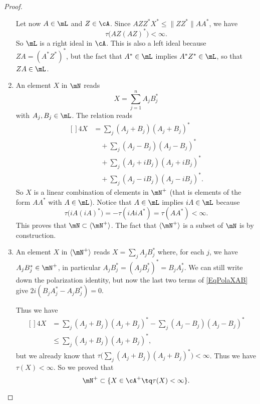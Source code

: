 \begin{proof}
\begin{enumerate}
            Let now $A\in\mL$ and $Z\in\cA$. Since $AZZ^*X^*\leq\| ZZ^* \|AA^*$, we have 
            \begin{equation}
                \tau\big( AZ(AZ)^* \big)<\infty.
            \end{equation}
            So $\mL$ is a right ideal in $\cA$. This is also a left ideal because $ZA=(A^*Z^*)^*$, but the fact that $A^*\in\mL$ implies $A^*Z^*\in\mL$, so that $ZA\in\mL$.
        \item
            An element $X$ in $\mN$ reads
            \begin{equation}
                X=\sum_{j=1}^{n}A_jB_j^*
            \end{equation}
            with $A_j,B_j\in\mL$. The  relation reads
            \begin{equation}        \label{EqPolaXAB}
                \begin{aligned}[]
                    4X&=\sum_j(A_j+B_j)(A_j+B_j)^*\\
                    &\quad+\sum_j(A_j-B_j)(A_j-B_j)^*\\
                    &\quad+\sum_j(A_j+iB_j)(A_j+iB_j)^*\\
                    &\quad+\sum_j(A_j-iB_j)(A_j-iB_j)^*.
                \end{aligned}
            \end{equation}
            So $X$ is a linear combination of elements in $\mN^+$ (that is elements of the form $AA^*$ with $A\in\mL$). Notice that $A\in\mL$ implies $iA\in\mL$ because
            \begin{equation}
                \tau\big( iA(iA)^* \big)=-\tau(iAiA^*)=\tau(AA^*)<\infty.
            \end{equation}
            This proves that $\mN\subset\langle \mN^+\rangle$. The fact that $\langle \mN^+\rangle$ is a subset of $\mN$ is by construction.
        \item
            An element $X$ in $\langle \mN^+\rangle$  reads $X=\sum_jA_jB^*_j$ where, for each $j$, we have $A_jB_j^*\in\mN^+$, in particular $A_jB^*_j=(A_jB^*_j)^*=B_jA_j^*$. We can still write down the polarization identity, but now the last two terms of \eqref{EqPolaXAB} give $2i(B_jA_j^*-A_jB_j^*)=0$. 

            Thus we have
            \begin{equation}
                \begin{aligned}[]
                    4X&=\sum_j(A_j+B_j)(A_j+B_j)^*-\sum_j(A_j-B_j)(A_j-B_j)^*\\
                    &\leq\sum_j(A_j+B_j)(A_j+B_j)^*,
                \end{aligned}
            \end{equation}
            but we already know that $\tau\big( \sum_j(A_j+B_j)(A_j+B_j)^* \big)<\infty$. Thus we have $\tau(X)<\infty$. So we proved that
            \begin{equation}
                \mN^+\subset\{ X\in\cA^+\tq\tau(X)<\infty \}.
            \end{equation}
            

\end{enumerate}
\end{proof}
